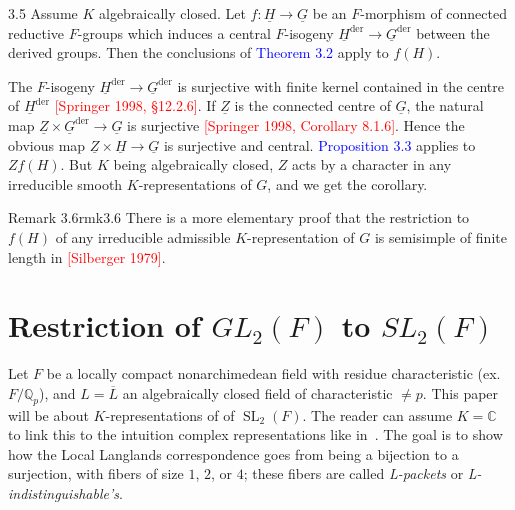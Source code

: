 \documentclass{article}
\newcommand{\C}{{\mathbb{C}}}
\newcommand{\Q}{{\mathbb{Q}}}
\newcommand{\SL}{{\operatorname{SL}}}
\begin{document}
\begin{cor}{}{3.5}
Assume \(K\) algebraically closed. Let \(f: \underline{H} \to \underline{G}\) be an \(F\)-morphism of connected reductive \(F\)-groups which induces a central \(F\)-isogeny \(\underline{H}^{\mathrm{der}} \to \underline{G}^{\mathrm{der}}\) between the derived groups. Then the conclusions of \textcolor{blue}{Theorem 3.2} apply to \(f(H)\).
\end{cor}
\begin{Proof}
The \(F\)-isogeny \(\underline{H}^{\mathrm{der}} \to \underline{G}^{\mathrm{der}}\) is surjective with finite kernel contained in the centre of \(\underline{H}^{\mathrm{der}}\) \textcolor{red}{[Springer 1998, §12.2.6]}. If \(\underline{Z}\) is the connected centre of \(\underline{G}\), the natural map \(\underline{Z} \times \underline{G}^{\mathrm{der}} \to \underline{G}\) is surjective \textcolor{red}{[Springer 1998, Corollary 8.1.6]}. Hence the obvious map \(\underline{Z} \times \underline{H} \to \underline{G}\) is surjective and central. \textcolor{blue}{Proposition 3.3} applies to \(Zf(H)\). But \(K\) being algebraically closed, \(Z\) acts by a character in any irreducible smooth \(K\)-representations of \(G\), and we get the corollary.
\end{Proof}

\begin{titledBox}{Remark 3.6}{rmk3.6}
There is a more elementary proof that the restriction to \(f(H)\) of any irreducible admissible \(K\)-representation of \(G\) is semisimple of finite length in \textcolor{red}{[Silberger 1979]}.
\end{titledBox}




\section{Restriction of $GL_2(F)$ to $SL_2(F)$}

Let $F$ be a locally compact nonarchimedean field with residue characteristic (ex. $F/\Q_p$), and $L
= \overline{L}$ an algebraically closed field of characteristic $\ne p$. This paper will be about
$K$-representations of of $\SL_2(F)$. The reader can assume $K = \C$ to link this to the intuition complex
representations like in~\cite{bushnellLocalLanglandsConjecture2006}. The goal is to show how the Local Langlands
correspondence goes from being a bijection to a surjection, with fibers of size $1$, $2$, or $4$; these fibers
are called \emph{L-packets} or \emph{L-indistinguishable's}.
\end{document}
